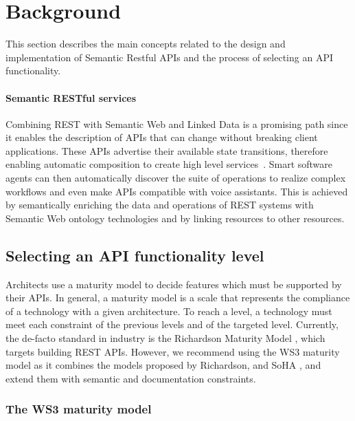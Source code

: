 \section{Background} \label{sec:background}

\vspace*{-0.2cm}


This section describes the main concepts related to the design and implementation of Semantic Restful APIs and the process of selecting an API functionality.

\paragraph{Semantic RESTful services}
Combining REST with Semantic Web and Linked Data is a promising path since it enables the description of APIs that can change without breaking client applications. These APIs advertise their available state transitions, therefore enabling automatic composition to create high level services~\cite{alarcon2015rest}. Smart software agents can then automatically discover the suite of operations to realize complex workflows and even make APIs compatible with voice assistants. This is achieved by semantically enriching the data and operations of REST systems with Semantic Web ontology technologies and by linking resources to other resources.

\subsection{Selecting an API functionality level}\label{sec:maturityLevel}

Architects use a maturity model to decide features which must be supported by their APIs. In general, a maturity model is a scale that represents the compliance of a technology with a given architecture. To reach a level, a technology must meet each constraint of the previous levels and of the targeted level.
Currently, the de-facto standard in industry is the Richardson Maturity Model \cite{RichardsonMaturityModel}, which targets building REST APIs. However, we recommend using the WS3 maturity model \cite{7195633} as it combines the models proposed by Richardson, and SoHA \cite{SoHA}, and extend them with semantic and documentation constraints.

\vspace*{-0.5cm}

\subsubsection{The WS3 maturity model}

